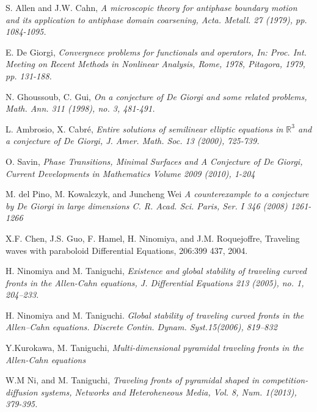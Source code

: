 \documentclass[12pt, a4paper]{article}
\numberwithin{equation}{section}
\newcommand{\R}{\mathbb{R}}
\begin{document}
\begin{CJK}{UTF8}{bkai}
\clearpage












\begin{thebibliography}{99}
	
	 S. Allen and J.W. Cahn, {\it A microscopic theory for antiphase boundary motion and its
application to antiphase domain coarsening, Acta. Metall. 27 (1979), pp. 1084-1095.}

	 E. De Giorgi, {\it Convergnece problems for functionals and operators, In: Proc. Int. Meeting
on Recent Methods in Nonlinear Analysis, Rome, 1978, Pitagora, 1979, pp. 131-188.}

	 N. Ghoussoub, C. Gui, {\it On a conjecture of De Giorgi and some related problems, Math. Ann. 311 (1998), no. 3, 481-491.}

	 L. Ambrosio, X. Cabr\'e, {\it Entire solutions of semilinear elliptic equations in $\R^3$ and a conjecture of De Giorgi, J. Amer. Math. Soc. 13 (2000), 725-739.}

	 O. Savin, {\it Phase Transitions, Minimal Surfaces and A Conjecture of De Giorgi, Current Developments in Mathematics
Volume 2009 (2010), 1-204}

	 M. del Pino, M. Kowalczyk, and Juncheng Wei {\it  A counterexample to a conjecture by De Giorgi in large dimensions C. R. Acad. Sci. Paris, Ser. I 346 (2008) 1261-1266}

	 X.F. Chen, J.S. Guo, F. Hamel, H. Ninomiya, and J.M. Roquejoffre,  Traveling waves with paraboloid
Differential Equations, 206:399 437, 2004.

	 H. Ninomiya and M. Taniguchi, {\it Existence and global stability of traveling curved fronts in the Allen-Cahn equations, J. Differential Equations 213 (2005), no. 1, 204--233.}

	 H. Ninomiya and M. Taniguchi. {\it Global stability of traveling curved fronts in the Allen–Cahn equations. Discrete Contin. Dynam. Syst.15(2006), 819–832}

	 Y.Kurokawa, M. Taniguchi, {\it Multi-dimensional pyramidal traveling fronts in the Allen-Cahn equations}

	 W.M Ni, and M. Taniguchi, {\it Traveling fronts of pyramidal shaped in competition-diffusion systems, Networks and Heteroheneous Media, Vol. 8, Num. 1(2013), 379-395.}


\end{thebibliography}
\end{CJK}
\end{document}
